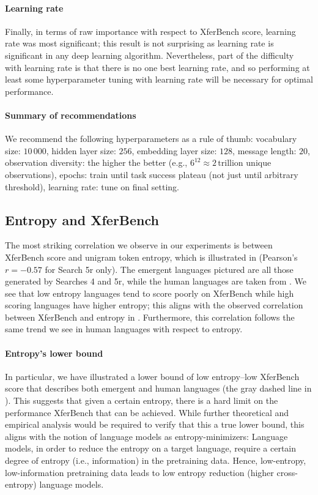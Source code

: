 \paragraph{Learning rate}
Finally, in terms of raw importance with respect to XferBench score, learning rate was most significant; this result is not surprising as learning rate is significant in any deep learning algorithm.
Nevertheless, part of the difficulty with learning rate is that there is no one best learning rate, and so performing at least some hyperparameter tuning with learning rate will be necessary for optimal performance.

\paragraph{Summary of recommendations}
We recommend the following hyperparameters as a rule of thumb:
vocabulary size: $10\,000$,
hidden layer size: $256$,
embedding layer size: $128$,
message length: $20$,
observation diversity: the higher the better (e.g., $6^{12}\approx 2\,\text{trillion}$ unique observations),
epochs: train until task success plateau (not just until arbitrary threshold),
learning rate: tune on final setting.


\subsection{Entropy and XferBench}
\unskip\label{hpo:sec:ent-xb}

The most striking correlation we observe in our experiments is between XferBench score and unigram token entropy, which is illustrated in  (Pearson's $r=-0.57$ for Search 5r only).
The emergent languages pictured are all those generated by Searches 4 and 5r, while the human languages are taken from \citet{xferbench}. 
We see that low entropy languages tend to score poorly on XferBench while high scoring languages have higher entropy; this aligns with the observed correlation between XferBench and entropy in \citet{elcc}.
Furthermore, this correlation follows the same trend we see in human languages with respect to entropy.

\paragraph{Entropy's lower bound}
In particular, we have illustrated a lower bound of low entropy--low XferBench score that describes both emergent and human languages (the gray dashed line in ).
This suggests that given a certain entropy, there is a hard limit on the performance XferBench that can be achieved.
While further theoretical and empirical analysis would be required to verify that this a true lower bound, this aligns with the notion of language models as entropy-minimizers:
Language models, in order to reduce the entropy on a target language, require a certain degree of entropy (i.e., information) in the pretraining data.
Hence, low-entropy, low-information pretraining data leads to low entropy reduction (higher cross-entropy) language models.

